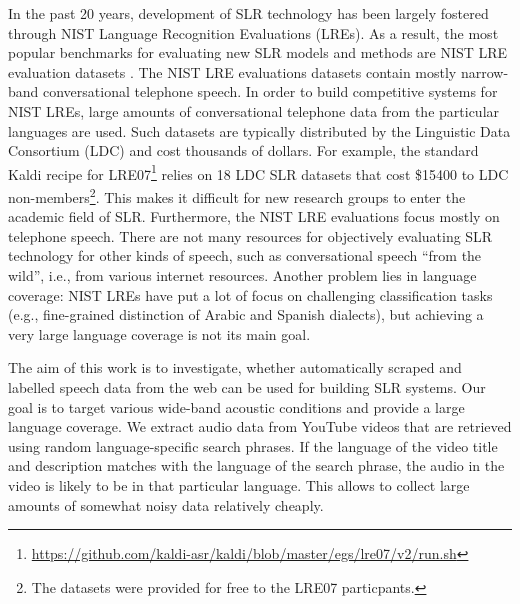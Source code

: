 \documentclass{article}
\begin{document}
In the past 20 years, development of SLR technology has been largely fostered through NIST Language Recognition Evaluations (LREs). As a result, the most popular benchmarks for evaluating new SLR models and methods are NIST LRE evaluation datasets \cite{sadjadi20182017}. The NIST LRE evaluations datasets contain mostly narrow-band conversational telephone speech. In order to build competitive systems for NIST LREs, large amounts of conversational telephone data from the particular languages are used. Such datasets are typically distributed by the Linguistic Data Consortium (LDC) and cost thousands of dollars. For example, the standard Kaldi \cite{kaldi} recipe for LRE07\footnote{\url{https://github.com/kaldi-asr/kaldi/blob/master/egs/lre07/v2/run.sh}} relies on 18 LDC SLR datasets that cost \$15400 to LDC non-members\footnote{The datasets were provided for free to the LRE07  particpants.}. This makes it difficult for new research groups to  enter the academic field of SLR. Furthermore, the NIST LRE evaluations focus mostly on telephone speech. There are not many resources for objectively evaluating SLR technology for other kinds of speech, such as conversational speech ``from the wild'', i.e., from various internet resources. Another problem lies in language coverage: NIST LREs have put a lot of focus on challenging classification tasks (e.g., fine-grained distinction of Arabic and Spanish dialects), but achieving a very large language coverage is not its main goal.  

The aim of this work is to investigate, whether automatically scraped and labelled speech data from the web can be used for building SLR systems. Our goal is to target various wide-band acoustic conditions and provide a large language coverage. We extract audio data from YouTube videos that are retrieved using random language-specific search phrases. If the language of the video title and description matches with the language of the search phrase, the audio in the video is likely to be in that particular language. This allows to collect large amounts of somewhat noisy data relatively cheaply.
\end{document}
